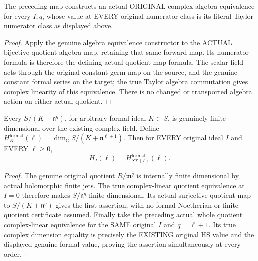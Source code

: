 \begin{theorem}
\label{hir:actual-original-formal-whole-jet-algebra-equivalence}
The preceding map constructs an actual ORIGINAL complex algebra
equivalence for every $I,q$, whose value at EVERY original numerator
class is its literal Taylor numerator class as displayed above.
\leanok
\end{theorem}
\begin{proof}
Apply the genuine algebra equivalence constructor to the ACTUAL
bijective quotient algebra map, retaining that same forward map. Its
numerator formula is therefore the defining actual quotient map formula.
The scalar field acts through the original constant-germ map on the
source, and the genuine constant formal series on the target; the true
Taylor algebra commutation gives complex linearity of this equivalence.
There is no changed or transported algebra action on either actual
quotient.
\end{proof}

\begin{theorem}
\label{hir:actual-original-formal-entire-hs-transfer}
Every $S/(K+\mathfrak n^q)$, for arbitrary formal ideal $K\subset S$,
is genuinely finite dimensional over the existing complex field. Define
$H^{\mathrm{formal}}_K(\ell)=\dim_\mathbb C S/(K+\mathfrak n^{\ell+1})$.
Then for EVERY original ideal $I$ and EVERY $\ell\ge0$,
\[
 H_I(\ell)=H^{\mathrm{formal}}_{S\mathcal T(I)}(\ell).
\]
\leanok
\end{theorem}
\begin{proof}
The genuine original quotient $R/\mathfrak m^q$ is internally finite
dimensional by actual holomorphic finite jets. The true complex-linear
quotient equivalence at $I=0$ therefore makes $S/\mathfrak n^q$ finite
dimensional. Its actual surjective quotient map to
$S/(K+\mathfrak n^q)$ gives the first assertion, with no formal
Noetherian or finite-quotient certificate assumed. Finally take the
preceding actual whole quotient complex-linear equivalence for the SAME
original $I$ and $q=\ell+1$. Its true complex dimension equality is
precisely the EXISTING original HS value and the displayed genuine formal
value, proving the assertion simultaneously at every order.
\end{proof}
